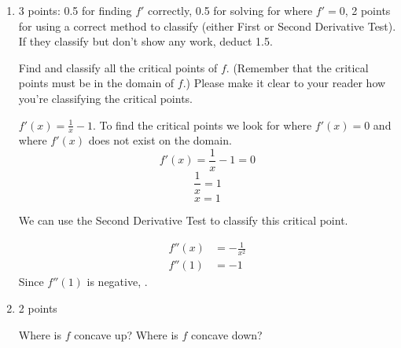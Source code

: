 \documentclass{article}
\begin{document}
\begin{enumerate}
\begin{enumerate}
    \begin{problem}[0.5in]
      What's the domain of $f$? 
    \end{problem}

    \begin{solution}
      We can't take the logarithm of a negative
      number, so the domain is $\boxed{(0, \infty)}$.
    \end{solution}

  \item

    \begin{grading}
      3 points: 0.5 for finding $f'$ correctly, 0.5 for solving for where $f' = 0$, 2 points for using a correct method to classify (either First or Second Derivative Test). If they classify but don't show any work, deduct 1.5. 
    \end{grading}

    \begin{problem}[\vfill]
      Find and classify all the critical points of $f$. (Remember that the critical points must be in the domain of $f$.) Please make it clear to your reader how you're classifying the critical points. 
    \end{problem}

    \begin{solution}

       $f'(x) = \frac{1}{x} -1$. To find the critical points we look for where $f'(x) = 0$ and where $f'(x)$ does not exist on the domain. 
        $$f'(x) = \frac{1}{x} - 1 = 0$$ 
        $$ \frac{1}{x} = 1$$ 
        $$x=1$$ 

        We can use the Second Derivative Test to classify this critical point.

        \begin{align*}
          f''(x) &= -\frac{1}{x^2} \\
          f''(1) &= -1
        \end{align*}
        Since $f''(1)$ is negative, .
    \end{solution} 

  \item

    \begin{grading}
      2 points
    \end{grading}

    \begin{problem}[\nstretch{0.75}]
      Where is $f$ concave up? Where is $f$ concave down? 
    \end{problem}


\end{enumerate}
\end{enumerate}
\end{document}
